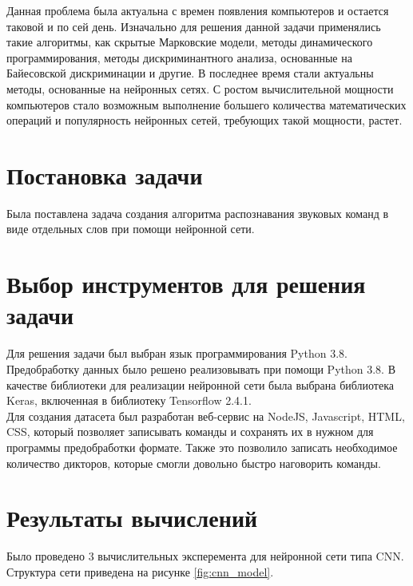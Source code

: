 \documentclass[14pt]{article}
\begin{document}
    Данная проблема была актуальна с времен появления компьютеров и остается таковой и по сей день. Изначально для решения данной задачи применялись такие алгоритмы, как скрытые Марковские модели, методы динамического программирования, методы дискриминантного анализа, основанные на Байесовской дискриминации и другие. В последнее время стали актуальны методы, основанные на нейронных сетях. С ростом вычислительной мощности компьютеров стало возможным выполнение большего количества математических операций и популярность нейронных сетей, требующих такой мощности, растет. 

\section*{Постановка задачи}
Была поставлена задача создания алгоритма распознавания звуковых команд в виде отдельных слов при помощи нейронной сети.

\section*{Выбор инструментов для решения задачи}
Для решения задачи был выбран язык программирования Python 3.8. Предобработку данных было решено реализовывать при помощи Python 3.8.
В качестве библиотеки для реализации нейронной сети была выбрана библиотека Keras, включенная в библиотеку Tensorflow 2.4.1. \\

Для создания датасета был разработан веб-сервис на NodeJS, Javascript, HTML, CSS, который позволяет записывать команды и сохранять их в нужном для программы предобработки формате. Также это позволило записать необходимое количество дикторов, которые смогли довольно быстро наговорить команды.
\newpage

\section*{Результаты вычислений}
Было проведено 3 вычислительных эксперемента для нейронной сети типа CNN. Структура сети приведена на рисунке \ref{fig:cnn_model}.
\end{document}
